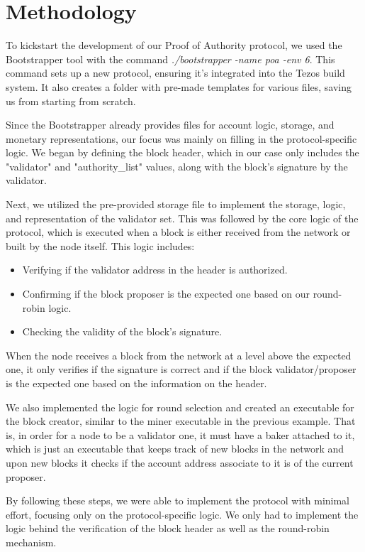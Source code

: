 \section{Methodology}

To kickstart the development of our Proof of Authority protocol, we used the Bootstrapper tool with the command \textit{./bootstrapper -name poa -env 6}. This command sets up a new protocol, ensuring it's integrated into the Tezos build system. It also creates a folder with pre-made templates for various files, saving us from starting from scratch.

Since the Bootstrapper already provides files for account logic, storage, and monetary representations, our focus was mainly on filling in the protocol-specific logic. We began by defining the block header, which in our case only includes the "validator" and "authority\_list" values, along with the block's signature by the validator.

Next, we utilized the pre-provided storage file to implement the storage, logic, and representation of the validator set. This was followed by the core logic of the protocol, which is executed when a block is either received from the network or built by the node itself. This logic includes:

\begin{itemize}
    \item Verifying if the validator address in the header is authorized.
    \item Confirming if the block proposer is the expected one based on our round-robin logic.
    \item Checking the validity of the block's signature.
\end{itemize}

When the node receives a block from the network at a level above the expected one, it only verifies if the signature is correct and if the block validator/proposer is the expected one based on the information on the header.


We also implemented the logic for round selection and created an executable for the block creator, similar to the miner executable in the previous example. That is, in order for a node to be a validator one, it must have a baker attached to it, which is just an executable that keeps track of new blocks in the network and upon new blocks it checks if the account address associate to it is of the current proposer.

By following these steps, we were able to implement the protocol with minimal effort, focusing only on the protocol-specific logic. We only had to implement the logic behind the verification of the block header as well as the round-robin  mechanism.

